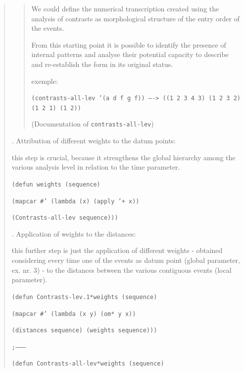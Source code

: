 \begin{quotation}
\begin{quotation}
\begin{slshape}
\noindent We could define the numerical transcription created using the analysis of contrasts as morphological structure of the entry order of the events.

\noindent From this starting point it is possible to identify the presence of internal patterns and analyse their potential capacity to describe and re-establish the form in its original status.

\noindent exemple:
\end{slshape}

\noindent\texttt{\footnotesize (contrasts-all-lev '(a d f g f)) ----> ((1 2 3 4 3) (1 2 3 2) (1 2 1) (1 2))}

\noindent (Documentation of \texttt{contrasts-all-lev})
\end{quotation} 
\begin{slshape} 
. Attribution of different weights to the datum points:

\noindent this step is crucial, because it strengthens the global hierarchy among the various analysis level in relation to the time parameter.
\end{slshape} 

\noindent\texttt{\footnotesize (defun weights (sequence)}

\noindent\texttt{\footnotesize \quad   (mapcar \#' (lambda (x) (apply '+ x))}

\noindent\texttt{\footnotesize \quad \quad  (Contrasts-all-lev sequence)))}

\begin{slshape} 
. Application of weights to the distances:

\noindent this further step is just the application of different weights - obtained considering every time one of the events as datum point (global parameter, ex. nr. 3) - to the distances between the various contiguous events (local parameter).
\end{slshape} 

\noindent\texttt{\footnotesize (defun Contrasts-lev.1*weights (sequence)}

\noindent\texttt{\footnotesize \quad    (mapcar \#' (lambda (x y) (om* y x))}

\noindent\texttt{\footnotesize \quad  \quad (distances sequence) (weights sequence)))}

\noindent\texttt{\footnotesize ;--------}

\noindent\texttt{\footnotesize (defun Contrasts-all-lev*weights (sequence)}


\end{quotation}
